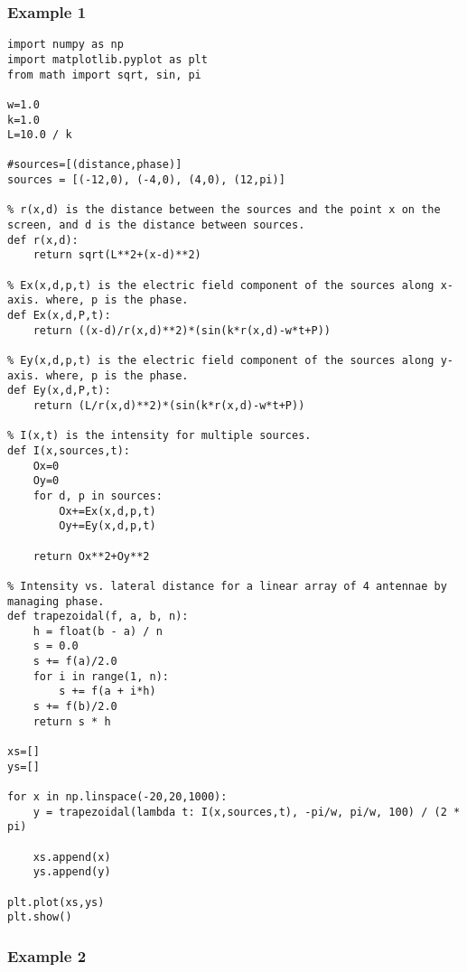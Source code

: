 \subsubsection{Example 1}\label{code:phase_right}

\begin{Verbatim}[fontsize=\small,baselinestretch=0.9]
import numpy as np
import matplotlib.pyplot as plt
from math import sqrt, sin, pi

w=1.0
k=1.0
L=10.0 / k

#sources=[(distance,phase)]
sources = [(-12,0), (-4,0), (4,0), (12,pi)]

% r(x,d) is the distance between the sources and the point x on the screen, and d is the distance between sources.
def r(x,d):
    return sqrt(L**2+(x-d)**2)
    
% Ex(x,d,p,t) is the electric field component of the sources along x-axis. where, p is the phase.
def Ex(x,d,P,t):
    return ((x-d)/r(x,d)**2)*(sin(k*r(x,d)-w*t+P))

% Ey(x,d,p,t) is the electric field component of the sources along y-axis. where, p is the phase.
def Ey(x,d,P,t):
    return (L/r(x,d)**2)*(sin(k*r(x,d)-w*t+P))
       
% I(x,t) is the intensity for multiple sources.
def I(x,sources,t):
    Ox=0
    Oy=0
    for d, p in sources:
        Ox+=Ex(x,d,p,t)
        Oy+=Ey(x,d,p,t)
    
    return Ox**2+Oy**2
        
% Intensity vs. lateral distance for a linear array of 4 antennae by managing phase.
def trapezoidal(f, a, b, n):
    h = float(b - a) / n
    s = 0.0
    s += f(a)/2.0
    for i in range(1, n):
        s += f(a + i*h)
    s += f(b)/2.0
    return s * h

xs=[]
ys=[]

for x in np.linspace(-20,20,1000):
    y = trapezoidal(lambda t: I(x,sources,t), -pi/w, pi/w, 100) / (2 * pi)
   
    xs.append(x)
    ys.append(y)

plt.plot(xs,ys)
plt.show()   
\end{Verbatim}


\subsubsection{Example 2}\label{code:phase_left}

